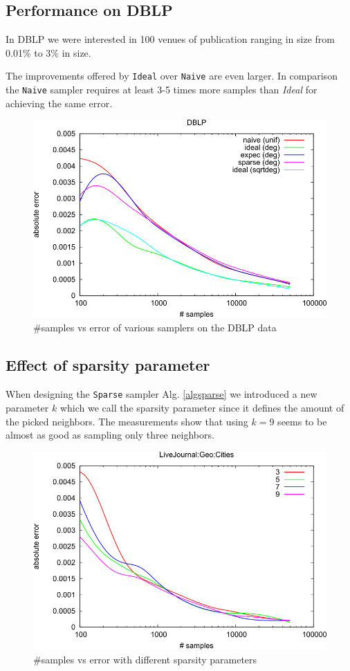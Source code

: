 \subsection{Performance on DBLP}
In DBLP we were interested in 100 venues of publication ranging in size from 0.01\% to 3\% in size.

The improvements offered by \texttt{Ideal} over \texttt{Naive} are even larger. In comparison the \texttt{Naive} sampler requires at least 3-5 times more samples than \textit{Ideal} for achieving the same error.
\begin{figure}[!ht]
  \begin{center}
    \includegraphics[width=0.5\linewidth]{fig4}
    \caption{\#samples vs error of various samplers on the DBLP data}
  \end{center}
\end{figure}
\subsection{Effect of sparsity parameter}
When designing the \texttt{Sparse} sampler Alg. \ref{algsparse} we introduced a new parameter $k$ which we call the sparsity parameter since it defines the amount of the picked neighbors.
The measurements show that using $k=9$ seems to be almost as good as sampling only three neighbors.
\begin{figure}[!ht]
  \begin{center}
    \includegraphics[width=0.5\linewidth]{fig7b}
    \caption{\#samples vs error with different sparsity parameters}
  \end{center}
\end{figure}
